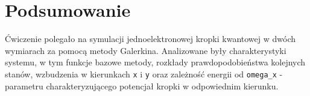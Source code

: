 \documentclass{article}
\begin{document}
\section{Podsumowanie}
Ćwiczenie polegało na symulacji jednoelektronowej kropki kwantowej w dwóch wymiarach za pomocą metody Galerkina.
Analizowane były charakterystyki systemu, w tym funkcje bazowe metody, rozkłady prawdopodobieństwa kolejnych stanów, wzbudzenia w kierunkach \texttt{x} i \texttt{y} oraz zależność energii od \texttt{omega\_x} - parametru charakteryzującego potencjał kropki w odpowiednim kierunku.


\end{document}
